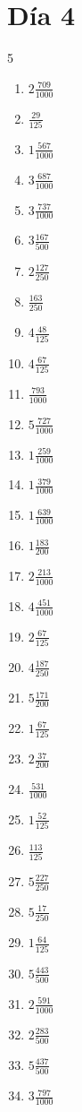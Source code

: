 \documentclass[12pt]{article}
\begin{document}
\section*{Día 4}
\begin{multicols}{5}\begin{enumerate}
\item $ 2 \frac{709}{1000} $
\item $ \frac{29}{125} $
\item $ 1 \frac{567}{1000} $
\item $ 3 \frac{687}{1000} $
\item $ 3 \frac{737}{1000} $
\item $ 3 \frac{167}{500} $
\item $ 2 \frac{127}{250} $
\item $ \frac{163}{250} $
\item $ 4 \frac{48}{125} $
\item $ 4 \frac{67}{125} $
\item $ \frac{793}{1000} $
\item $ 5 \frac{727}{1000} $
\item $ 1 \frac{259}{1000} $
\item $ 1 \frac{379}{1000} $
\item $ 1 \frac{639}{1000} $
\item $ 1 \frac{183}{200} $
\item $ 2 \frac{213}{1000} $
\item $ 4 \frac{451}{1000} $
\item $ 2 \frac{67}{125} $
\item $ 4 \frac{187}{250} $
\item $ 5 \frac{171}{200} $
\item $ 1 \frac{67}{125} $
\item $ 2 \frac{37}{200} $
\item $ \frac{531}{1000} $
\item $ 1 \frac{52}{125} $
\item $ \frac{113}{125} $
\item $ 5 \frac{227}{250} $
\item $ 5 \frac{17}{250} $
\item $ 1 \frac{64}{125} $
\item $ 5 \frac{443}{500} $
\item $ 2 \frac{591}{1000} $
\item $ 2 \frac{283}{500} $
\item $ 5 \frac{437}{500} $
\item $ 3 \frac{797}{1000} $

\end{enumerate}
\end{multicols}
\end{document}
